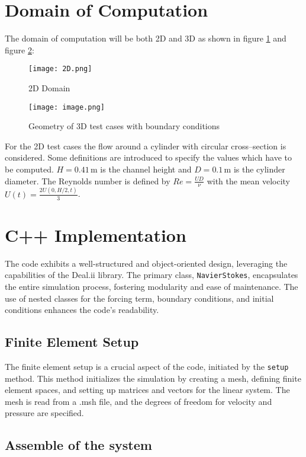 \documentclass{article}
\begin{document}
\section{Domain of Computation}
The domain of computation will be both 2D and 3D as shown in figure \ref{fig:2D} and figure \ref{fig:3D}:
\begin{figure}[h]
    \centering
    \texttt{[image: 2D.png]}
    \caption{2D Domain}
    \label{fig:2D}
\end{figure}
\begin{figure}[h]
    \centering
    \texttt{[image: image.png]}
    \caption{Geometry of 3D test cases with boundary conditions}
    \label{fig:3D}
\end{figure}
For the 2D test cases the flow around a cylinder with circular cross–section is considered.
Some definitions are introduced to specify the values which have to be computed. $H = 0.41 \, \text{m}$ is the channel height and $D = 0.1 \, \text{m}$ is the cylinder diameter. The Reynolds number is defined by $Re = \frac{UD}{\nu}$ with the mean velocity $U(t) = \frac{2U(0, H/2, t)}{3}$.


\section{C++ Implementation}

The code exhibits a well-structured and object-oriented design, leveraging the capabilities of the Deal.ii library. The primary class, \texttt{NavierStokes}, encapsulates the entire simulation process, fostering modularity and ease of maintenance. The use of nested classes for the forcing term, boundary conditions, and initial conditions enhances the code's readability.

\subsection{Finite Element Setup}

The finite element setup is a crucial aspect of the code, initiated by the \texttt{setup} method. This method initializes the simulation by creating a mesh, defining finite element spaces, and setting up matrices and vectors for the linear system. The mesh is read from a .msh file, and the degrees of freedom for velocity and pressure are specified.

\subsection{Assemble of the system}
\end{document}
